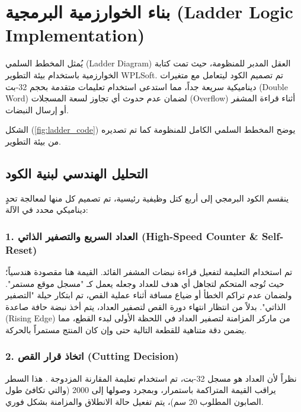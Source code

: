 \clearpage


\section{بناء الخوارزمية البرمجية \textenglish{(Ladder Logic Implementation)}}
\label{sec:ladder_code}

يُمثل المخطط السلمي \textenglish{(Ladder Diagram)} العقل المدبر للمنظومة، حيث تمت كتابة الخوارزمية باستخدام بيئة التطوير \textenglish{WPLSoft}. تم تصميم الكود ليتعامل مع متغيرات ديناميكية سريعة جداً، مما استدعى استخدام تعليمات متقدمة بحجم 32-بت \textenglish{(Double Word)} لضمان عدم حدوث أي تجاوز لسعة المسجلات \textenglish{(Overflow)} أثناء قراءة المشفر أو إرسال النبضات.

الشكل (\ref{fig:ladder_code}) يوضح المخطط السلمي الكامل للمنظومة كما تم تصديره من بيئة التطوير.


\subsection{التحليل الهندسي لبنية الكود}
ينقسم الكود البرمجي إلى أربع كتل وظيفية رئيسية، تم تصميم كل منها لمعالجة تحدٍ ديناميكي محدد في الآلة:

\subsubsection{1. العداد السريع والتصفير الذاتي \textenglish{(High-Speed Counter \& Self-Reset)}}
تم استخدام التعليمة  لتفعيل قراءة نبضات المشفر القائد. القيمة  هنا مقصودة هندسياً؛ حيث تُوجه المتحكم لتجاهل أي هدف للعداد وجعله يعمل كـ "مسجل موقع مستمر". 
ولضمان عدم تراكم الخطأ أو ضياع مسافة أثناء عملية القص، تم ابتكار حيلة "التصفير الذاتي". بدلاً من انتظار انتهاء دورة القص لتصفير العداد، يتم أخذ نبضة حافة صاعدة \textenglish{(Rising Edge)} من ماركر المزامنة  لتصفير العداد  في اللحظة الأولى لبدء القطع، مما يضمن دقة متناهية للقطعة التالية حتى وإن كان المنتج مستمراً بالحركة.

\subsubsection{2. اتخاذ قرار القص \textenglish{(Cutting Decision)}}
نظراً لأن العداد  هو مسجل 32-بت، تم استخدام تعليمة المقارنة المزدوجة . هذا السطر يراقب القيمة المتراكمة باستمرار، وبمجرد وصولها إلى 2000 (والتي تكافئ طول الصابون المطلوب 20 سم)، يتم تفعيل حالة الانطلاق والمزامنة  بشكل فوري.

